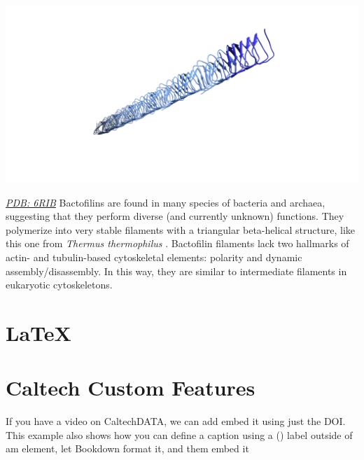 \documentclass[]{tufte-book}
\begin{document}
\includegraphics{img/3_6_1}

\href{http://rcsb.org/structure/6RIB}{\emph{PDB: 6RIB}} Bactofilins are
found in many species of bacteria and archaea, suggesting that they
perform diverse (and currently unknown) functions. They polymerize into
very stable filaments with a triangular beta-helical structure, like
this one from \emph{Thermus thermophilus} \citep{deng2019}. Bactofilin
filaments lack two hallmarks of actin- and tubulin-based cytoskeletal
elements: polarity and dynamic assembly/disassembly. In this way, they
are similar to intermediate filaments in eukaryotic cytoskeletons.

\section{LaTeX}\label{latex}

\section{Caltech Custom Features}\label{caltech-custom-features}

If you have a video on CaltechDATA, we can add embed it using just the
DOI. This example also shows how you can define a caption using a ()
label outside of am element, let Bookdown format it, and them embed it
\end{document}
